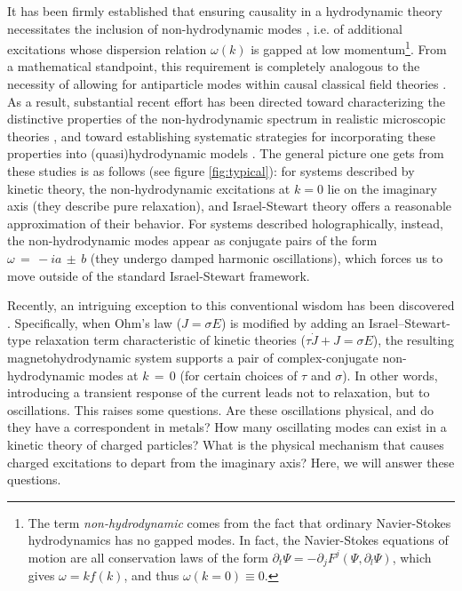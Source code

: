 \documentclass[a4paper, amsfonts, amssymb, amsmath, reprint, showkeys, nofootinbib, twoside,notitlepage,onecolumn]{revtex4-1}
\theoremstyle{definition}
\theoremstyle{theorem}
\begin{document}
It has been firmly established that ensuring causality in a hydrodynamic theory necessitates the inclusion of non-hydrodynamic modes \cite{HellerBounds2022ejw,GavassinoDisperisons2023mad}, i.e. of additional excitations whose dispersion relation $\omega(k)$ is gapped at low momentum\footnote{The term \textit{non-hydrodynamic} comes from the fact that ordinary Navier-Stokes hydrodynamics has no gapped modes. In fact, the Navier-Stokes equations of motion are all conservation laws of the form $\partial_t \Psi{=}-\partial_j F^j(\Psi,\partial_l \Psi)$, which gives $\omega=k f(k)$, and thus  $\omega(k{=}0)\equiv 0$.}. From a mathematical standpoint, this requirement is completely analogous to the necessity of allowing for antiparticle modes within causal classical field theories \cite{GavassinoDisperisons2023mad}. As a result, substantial recent effort has been directed toward characterizing the distinctive properties of the non-hydrodynamic spectrum in realistic microscopic theories \cite{KovtunHolography2005,Denicol_Relaxation_2011,Moore:2018mma,Andrade:2019zey,BAGGIOLI20201,Wagner:2023jgq,GavassinoGapless:2024rck,Brants:2024wrx,RochaBranchcut:2024cge,AhnBaggioli:2025odk,Hernandez:2025zxw,Bajec:2025dqm}, and toward establishing systematic strategies for incorporating these properties into (quasi)hydrodynamic models \cite{Israel_Stewart_1979,Denicol2012Boltzmann,Heller2014,Grozdanov2019,BulkGavassino,GavassinoNonHydro2022,GavassinoGENERIC:2022isg,GavassinoBurgers:2023eoz,GavassinoUniveraalityI2023odx,Denicol:2024cpj}. The general picture one gets from these studies is as follows (see figure \ref{fig:typical}): for systems described by kinetic theory, the non-hydrodynamic excitations at $k{=}0$ lie on the imaginary axis (they describe pure relaxation), and Israel-Stewart theory offers a reasonable approximation of their behavior. For systems described holographically, instead, the non-hydrodynamic modes appear as conjugate pairs of the form $\omega\,{=}\,{-}ia\,{\pm}\, b$ (they undergo damped harmonic oscillations), which forces us to move outside of the standard Israel-Stewart framework. 

Recently, an intriguing exception to this conventional wisdom has been discovered \cite{Dash:2022xkz}. Specifically, when Ohm’s law ($J=\sigma E$) is modified by adding an Israel–Stewart-type relaxation term characteristic of kinetic theories ($\tau \dot{J}+J=\sigma E$), the resulting magnetohydrodynamic system supports a pair of complex-conjugate non-hydrodynamic modes at $k\,{=}\,0$ (for certain choices of $\tau$ and $\sigma$). In other words, introducing a transient response of the current leads not to relaxation, but to oscillations. This raises some questions. Are these oscillations physical, and do they have a correspondent in metals? How many oscillating modes can exist in a kinetic theory of charged particles? What is the physical mechanism that causes charged excitations to depart from the imaginary axis? Here, we will answer these questions.
\end{document}
